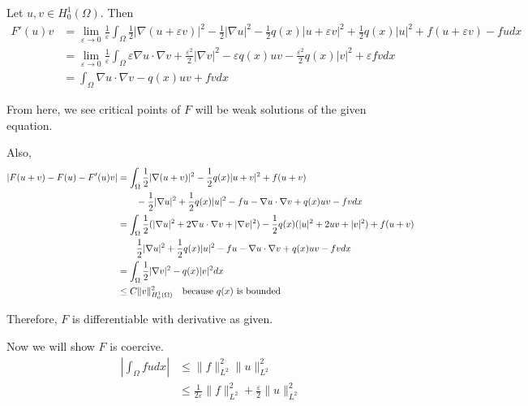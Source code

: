 \documentclass[a4paper]{article}
\begin{document}
\begin{enumerate}
    Let $u, v \in H^1_0(\Omega)$. Then
    \begin{align*}
      F'(u) v &= \lim_{\varepsilon \to 0} \frac{1}{\varepsilon} \int_{\Omega}^{} \frac{1}{2} |\nabla(u+\varepsilon v)|^2 - \frac{1}{2} |\nabla u|^2 -
      \frac{1}{2} q(x) |u + \varepsilon v|^2 + \frac{1}{2} q(x) |u|^2 + f(u+ \varepsilon v) - f u dx \\
      &= \lim_{\varepsilon \to 0} \frac{1}{\varepsilon} \int_{\Omega}^{} \varepsilon \nabla u \cdot \nabla v + \frac{\varepsilon^2}{2} |\nabla v|^2 -
      \varepsilon q(x) u v - \frac{\varepsilon^2}{2} q(x) |v|^2 + \varepsilon f v dx \\
      &= \int_{\Omega}^{} \nabla u \cdot \nabla v - q(x) uv + fv dx
    \end{align*}

    From here, we see critical points of $F$ will be weak solutions of the given equation.

    Also,
    \begin{align*}
      | F(u+v) - F(u) - F'(u)v | &= \int_{\Omega}^{} \frac{1}{2} | \nabla (u+v) |^2 - \frac{1}{2} q(x) |u+v|^2 + f(u+v) \\
      &\quad \quad - \frac{1}{2} |\nabla u|^2 + \frac{1}{2} q(x) |u|^2 - f u - \nabla u \cdot \nabla v + q(x) uv - fv dx \\
      &= \int_{\Omega}^{} \frac{1}{2} ( | \nabla u |^2 + 2 \nabla u \cdot \nabla v + | \nabla v |^2 ) - \frac{1}{2} q(x) ( |u|^2 + 2uv + |v|^2) + f(u + v) \\
      &\quad \quad \frac{1}{2} |\nabla u|^2 + \frac{1}{2} q(x) |u|^2 - fu - \nabla u \cdot \nabla v + q(x) uv - fv dx \\
      &= \int_{\Omega}^{} \frac{1}{2} |\nabla v|^2 - q(x) |v|^2 dx \\
      &\leq C \|v\|_{H_0^1(\Omega)}^2 \quad \parbox{5cm}{because $q(x)$ is bounded}
    \end{align*}

    Therefore, $F$ is differentiable with derivative as given.

    Now we will show $F$ is coercive.
    \begin{align*}
      \left| \int_{\Omega}^{} fu dx \right| &\leq \|f\|_{L^2}^2 \|u\|_{L^2}^2 \\
      &\leq \frac{1}{2 \varepsilon} \|f\|_{L^2}^2 + \frac{\varepsilon}{2} \|u\|_{L^2}^2
    \end{align*}


\end{enumerate}
\end{document}
